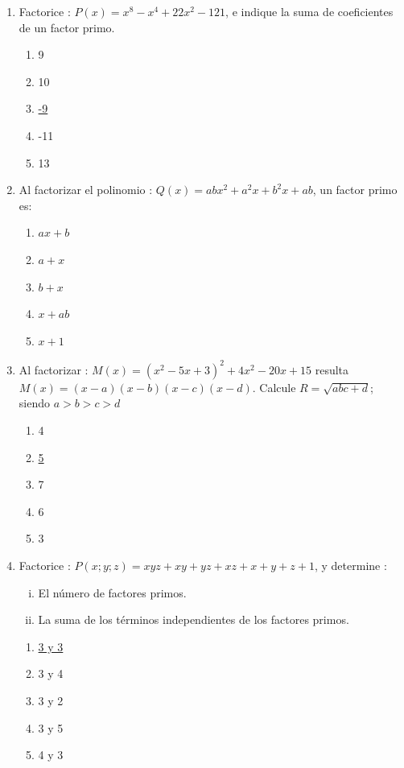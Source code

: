 \documentclass{article}
\begin{document}
\begin{enumerate}
\item{Factorice : $P(x) = x^8 - x^4 + 22x^2 - 121$, e indique la suma de coeficientes de un factor primo.
\begin{enumerate}
\item{9}
\item{10}
\item{\underline{-9}}
\item{-11}
\item{13}
\end{enumerate}
}

\item{Al factorizar el polinomio : $Q(x) = abx^2 + a^2x + b^2x + ab$, un factor primo es:
\begin{enumerate}
\item{\underline{$ax + b$}}
\item{$a + x$}
\item{$b + x$}
\item{$x + ab$}
\item{$x + 1$}
\end{enumerate}
}

\item{Al factorizar : $M(x) = (x^2 - 5x + 3)^2 + 4x^2 - 20x + 15$ resulta $M(x) = (x-a)(x-b)(x-c)(x-d)$. Calcule $R = \sqrt{abc + d}$; siendo $a > b > c > d$ 
\begin{enumerate}
\item{4}
\item{\underline{5}}
\item{7}
\item{6}
\item{3}
\end{enumerate}
}

\item{Factorice : $P(x;y;z) = xyz + xy + yz + xz + x + y + z + 1$, y determine :
\begin{enumerate}[i)]
\item{El n\'umero de factores primos.}
\item{La suma de los t\'erminos independientes de los factores primos.}
\end{enumerate}
\begin{enumerate}
\item{\underline{3 y 3}}
\item{3 y 4}
\item{3 y 2}
\item{3 y 5}
\item{4 y 3}
\end{enumerate}
}


\end{enumerate}
\end{document}
